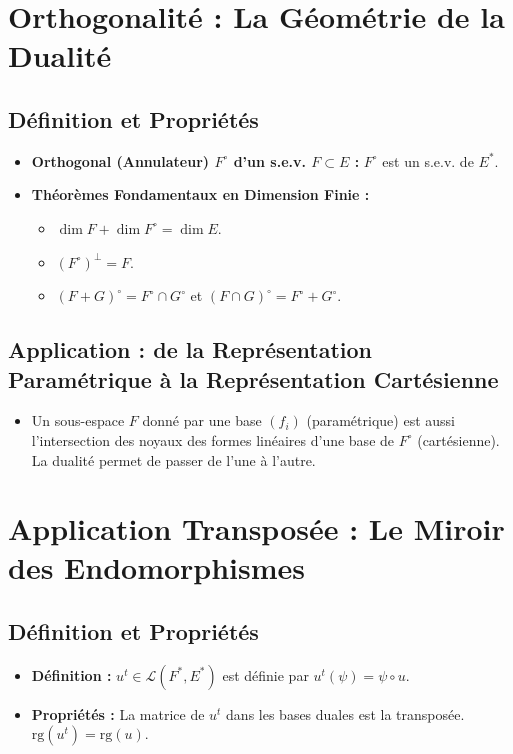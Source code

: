 \documentclass[12pt, a4paper, parskip=full]{report}
\theoremstyle{agregstyle}
\begin{document}
\section{Orthogonalité : La Géométrie de la Dualité}
\subsection{Définition et Propriétés}
\begin{itemize}
    \item \textbf{Orthogonal (Annulateur) $F^\circ$ d'un s.e.v. $F \subset E$ :} $F^\circ$ est un s.e.v. de $E^*$.
    \item \textbf{Théorèmes Fondamentaux en Dimension Finie :}
        \begin{itemize}
            \item $\dim F + \dim F^\circ = \dim E$.
            \item $(F^\circ)^\perp = F$.
            \item $(F+G)^\circ = F^\circ \cap G^\circ$ et $(F \cap G)^\circ = F^\circ + G^\circ$.
        \end{itemize}
\end{itemize}
\subsection{Application : de la Représentation Paramétrique à la Représentation Cartésienne}
\begin{itemize}
    \item Un sous-espace $F$ donné par une base $(f_i)$ (paramétrique) est aussi l'intersection des noyaux des formes linéaires d'une base de $F^\circ$ (cartésienne). La dualité permet de passer de l'une à l'autre.
\end{itemize}

\section{Application Transposée : Le Miroir des Endomorphismes}
\subsection{Définition et Propriétés}
\begin{itemize}
    \item \textbf{Définition :} $u^t \in \mathcal{L}(F^*, E^*)$ est définie par $u^t(\psi) = \psi \circ u$.
    \item \textbf{Propriétés :} La matrice de $u^t$ dans les bases duales est la transposée. $\mathrm{rg}(u^t) = \mathrm{rg}(u)$.
\end{itemize}
\end{document}
